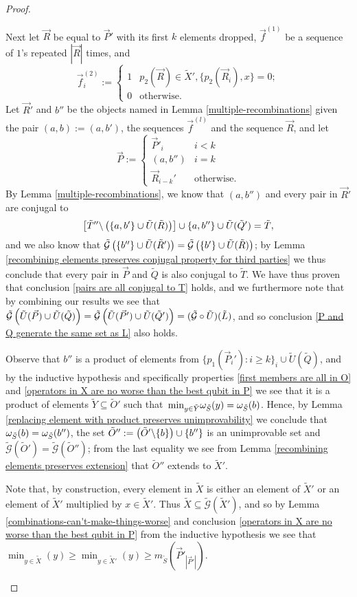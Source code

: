 \documentclass[twocolumn,showpacs,preprintnumbers,amsmath,amssymb,nofootinbib,pra,floatfix]{revtex4-1}
\newcommand{\lst}{\vec}
\newcommand{\set}{\tilde}
\newcommand{\genfun}{\tilde{\mathcal{G}}}
\begin{document}
\begin{proof}
\begin{description}
Next let $\lst R$ be equal to $\lst P'$ with its first $k$ elements dropped, $\lst f^{(1)}$ be a sequence of $1$'s repeated $|\lst R|$ times, and
$$\lst f^{(2)}_i :=
\begin{cases}
1 & p_2(\lst R)\in\set X', \{p_2(\lst R_i),x\} = 0; \\
0 & \text{otherwise}.
\end{cases}
$$
Let $\lst R'$ and $b''$ be the objects named in Lemma \ref{multiple-recombinations} given the pair $(a,b):=(a,b')$, the sequences $\lst f^{(l)}$ and the sequence $\lst R$, and let
$$\lst P :=
\begin{cases}
\lst P'_i & i < k \\
(a,b'') & i=k \\
\lst R_{i-k}' & \text{otherwise}.
\end{cases}
$$
By Lemma \ref{multiple-recombinations}, we know that $(a,b'')$ and every pair in $\lst R'$ are conjugal to
$$\left[\set T''\backslash\paren{\{a,b'\} \cup \set U(\set R)}\right]\cup \{a,b''\} \cup \set U(\set Q')=\set T,$$
and we also know that $\genfun\paren{\{b''\}\cup \set U(\set R')}=\genfun\paren{\{b'\}\cup \set U(\set R)}$;
by Lemma \ref{recombining elements preserves conjugal property for third parties} we thus conclude that every pair in $\lst P$ and $\set Q$ is also conjugal to $\set T$.  We have thus proven that conclusion \ref{pairs are all conjugal to T} holds, and we furthermore note that by combining our results we see that $\genfun\paren{\set U(\lst P)\cup \set U(\set Q)}=\genfun\paren{\set U(\lst P')\cup \set U(\set Q')}=(\genfun\circ\set U)(\set L)$, and so conclusion \ref{P and Q generate the same set as L} also holds.

Observe that $b''$ is a product of elements from $\{p_1(\lst P_i') : i \ge k\}_i\cup\set U(\set Q)$, and by the inductive hypothesis and specifically properties \ref{first members are all in O} and \ref{operators in X are no worse than the best qubit in P} we see that it is a product of elements $\set Y\subseteq\set O'$ such that $\min_{y\in\set Y}\om_{\set S}(y)=\om_{\set S}(b)$.  Hence, by Lemma \ref{replacing element with product preserves unimprovability} we conclude that $\om_{\set S}(b)=\om_{\set S}(b'')$, the set $\set O'':=\paren{\set O'\backslash\{b\}}\cup\{b''\}$ is an unimprovable set and $\genfun(\set O')=\genfun(\set O'')$;  from the last equality we see from Lemma \ref{recombining elements preserves extension} that $\set O''$ extends to $\set X'$.

Note that, by construction, every element in $\set X$ is either an element of $\set X'$ or an element of $\set X'$ multiplied by $x\in\set X'$.  Thus $\set X\subseteq \genfun(\set X')$, and so by Lemma \ref{combinations-can't-make-things-worse} and conclusion \ref{operators in X are no worse than the best qubit in P} from the inductive hypothesis we see that $\min_{y\in\set X}(y) \ge \min_{y\in\set X'}(y) \ge m_{\set S}(\lst P'_{|\lst P'|})$.


\end{description}
\end{proof}
\end{document}
